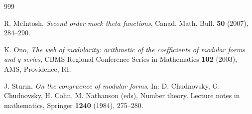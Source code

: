 \documentclass[12pt,reqno]{amsart}
\renewcommand{\o}{{\omega}}
\renewcommand{\(}{\left\(}
\renewcommand{\)}{\right\)}
\numberwithin{equation}{section}
\theoremstyle{plain}
\theoremstyle{definition}
\numberwithin{equation}{section}
\begin{document}
\begin{thebibliography}{999}













 R. McIntosh, {\it Second order mock theta functions}, Canad. Math. Bull. {\bf 50} (2007), 284--290.

 K. Ono, {\it The web of modularity: arithmetic of the coefficients of modular forms and $q$-series}, CBMS Regional Conference Series in Mathematics {\bf 102} (2003), AMS, Providence, RI.

 J. Sturm, {\it On the congruence of modular forms}. In: D. Chudnovsky, G. Chudnovsky, H. Cohn, M. Nathanson (eds), Number theory. Lecture notes in mathematics, Springer {\bf 1240} (1984),  275--280.





\end{thebibliography}
\end{document}
